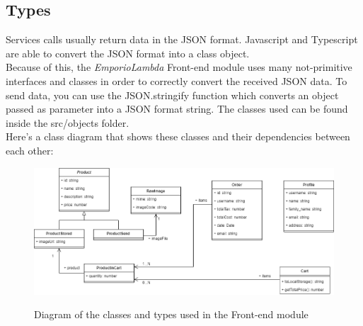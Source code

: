 \subsection{Types}
Services calls usually return data in the JSON format. Javascript and Typescript are able to convert the JSON format into a class object.\\
Because of this, the \textit{EmporioLambda} Front-end module uses many not-primitive interfaces and classes in order to correctly convert the received JSON data. To send data, you can use the JSON.stringify function which converts an object passed as parameter into a JSON format string. The classes used can be found inside the src/objects folder.\\ Here's a class diagram that shows these classes and their dependencies between each other:
\vspace{0.5cm}
\begin{figure}[H]
\centering
\includegraphics[scale=0.45]{res/Architettura/Frontend/img/class_frontend_types}\\
\caption{Diagram of the classes and types used in the Front-end module}
\end{figure}